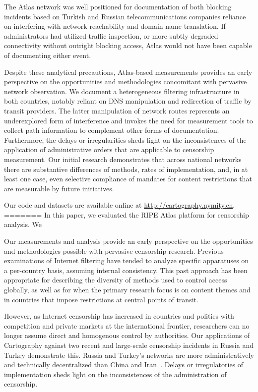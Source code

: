 The Atlas network was well positioned for documentation of both blocking incidents based on Turkish and Russian telecommunications companies reliance on interfering with network reachability and domain name translation. If administrators had utilized traffic inspection, or more subtly degraded connectivity without outright blocking access, Atlas would not have been capable of documenting either event.

Despite these analytical precautions, Atlas-based measurements provides an early perspective on the opportunities and methodologies concomitant with pervasive network observation. We document a heterogeneous filtering infrastructure in both countries, notably reliant on DNS manipulation and redirection of traffic by transit providers. The latter manipulation of network routes represents an underexplored form of interference and invokes the need for measurement tools to collect path information to complement other forms of documentation. Furthermore, the delays or irregularities sheds light on the inconsistences of the application of administrative orders that are applicable to censorship measurement. Our initial research demonstrates that across national networks there are substantive differences of methods, rates of implementation, and, in at least one case, even selective compliance of mandates for content restrictions that are measurable by future initiatives.

Our code and datasets are available online at \url{http://cartography.nymity.ch}.
=======
In this paper, we evaluated the RIPE Atlas platform for censorship analysis.
We

Our measurements and analysis provide an early perspective on the opportunities
and methodologies possible with pervasive censorship research. Previous
examinations of Internet filtering have tended to analyze specific apparatuses
on a per-country basis, assuming internal consistency. This past approach has
been appropriate for describing the diversity of methods used to control access
globally, as well as for when the primary research focus is on content themes
and in countries that impose restrictions at central points of transit. 

However, as Internet censorship has increased in countries and polities with
competition and private markets at the international frontier, researchers can
no longer assume direct and homogenous control by authorities. Our applications
of Cartography against two recent and large-scale censorship incidents in
Russia and Turkey demonstrate this. Russia and Turkey's networks are more
administratively and technically decentralized than China and
Iran~\cite{Roberts2011}. Delays or irregulatories of implementation sheds light
on the inconsistences of the administration of censorship. 

